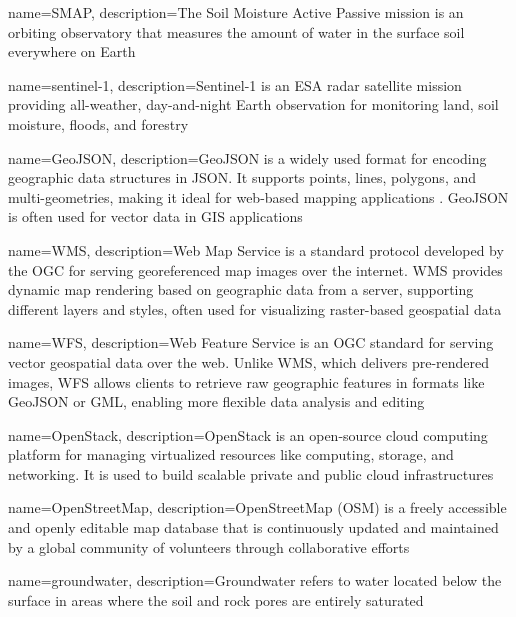 {
    name=SMAP,
    description={The Soil Moisture Active Passive mission is an orbiting observatory that measures the amount of water in the surface soil everywhere on Earth \cite{nasaSMAP}}
}

{
    name=sentinel-1,
    description={Sentinel-1 is an ESA radar satellite mission providing all-weather, day-and-night Earth observation for monitoring land, soil moisture, floods, and forestry \cite{esa_sentinel-1}}
}

{
    name=GeoJSON,
    description={GeoJSON is a widely used format for encoding geographic data structures in JSON. It supports points, lines, polygons, and multi-geometries, making it ideal for web-based mapping applications \cite{geojson}. GeoJSON is often used for vector data in GIS applications}
}

{
    name=WMS,
    description={Web Map Service is a standard protocol developed by the OGC for serving georeferenced map images over the internet. WMS provides dynamic map rendering based on geographic data from a server, supporting different layers and styles, often used for visualizing raster-based geospatial data \cite{ogc2006wms}}
}

{
    name=WFS,
    description={Web Feature Service is an OGC standard for serving vector geospatial data over the web. Unlike WMS, which delivers pre-rendered images, WFS allows clients to retrieve raw geographic features in formats like GeoJSON or GML, enabling more flexible data analysis and editing \cite{ogc2005wfs}}
}

{
    name=OpenStack,
    description={OpenStack is an open-source cloud computing platform for managing virtualized resources like computing, storage, and networking. It is used to build scalable private and public cloud infrastructures \cite{openstack}}
}

{
    name=OpenStreetMap,
    description={OpenStreetMap (OSM) is a freely accessible and openly editable map database that is continuously updated and maintained by a global community of volunteers through collaborative efforts \cite{openstreetmap}}
}

{
    name=groundwater,
    description={Groundwater refers to water located below the surface in areas where the soil and rock pores are entirely saturated \cite{senorge_terminology}}
}

